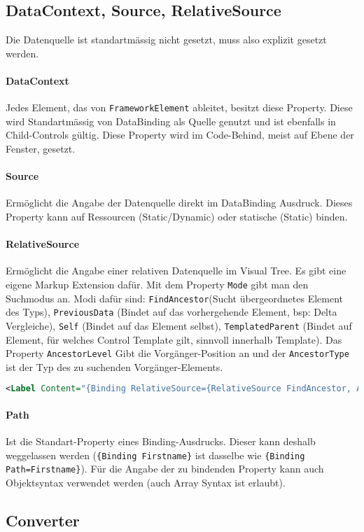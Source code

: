 \subsection{DataContext, Source, RelativeSource}
Die Datenquelle ist standartmässig nicht gesetzt, muss also explizit gesetzt werden. 
\paragraph{DataContext} Jedes Element, das von \verb+FrameworkElement+ ableitet, besitzt diese Property. Diese wird Standartmässig von DataBinding als Quelle genutzt und ist ebenfalls in Child-Controls gültig. Diese Property wird im Code-Behind, meist auf Ebene der Fenster, gesetzt.
\paragraph{Source} Ermöglicht die Angabe der Datenquelle direkt im DataBinding Ausdruck. Dieses Property kann auf Ressourcen (Static/Dynamic) oder statische (Static) binden.
\paragraph{RelativeSource} Ermöglicht die Angabe einer relativen Datenquelle im Visual Tree. Es gibt eine eigene Markup Extension dafür. Mit dem Property \verb+Mode+ gibt man den Suchmodus an. Modi dafür sind: \verb+FindAncestor+(Sucht übergeordnetes Element des Typs), \verb+PreviousData+ (Bindet auf das vorhergehende Element, bsp: Delta Vergleiche), \verb+Self+ (Bindet auf das Element selbst), \verb+TemplatedParent+ (Bindet auf Element, für welches Control Template gilt, sinnvoll innerhalb Template). Das Property \verb+AncestorLevel+ Gibt die Vorgänger-Position an und der \verb+AncestorType+ ist der Typ des zu suchenden Vorgänger-Elements.
\begin{lstlisting}[language=xml]
<Label Content="{Binding RelativeSource={RelativeSource FindAncestor, AncestorType=Window}, Path=Title}" />
\end{lstlisting}
\paragraph{Path} Ist die Standart-Property eines Binding-Ausdrucks. Dieser kann deshalb weggelassen werden (\verb+{Binding Firstname}+ ist dasselbe wie \verb+{Binding Path=Firstname}+). Für die Angabe der zu bindenden Property kann auch Objektsyntax verwendet werden (auch Array Syntax ist erlaubt).
\subsection{Converter}
